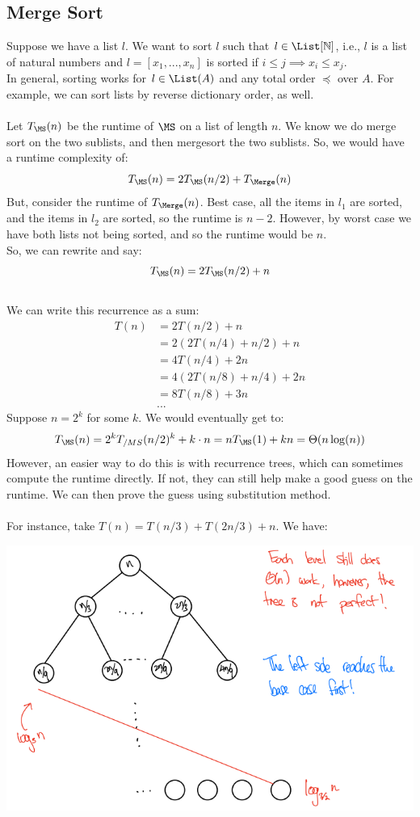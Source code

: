 \documentclass{article}
\begin{document}
\subsection{Merge Sort}
Suppose we have a list $l$. We want to sort $l$ such that $l \in \List[\mathbb{N}]$, i.e., $l$ is a list of natural numbers and $l = [x_1, ..., x_n]$ is sorted if $i \leq j \implies x_i \leq x_j$.\\
In general, sorting works for $l \in \List(A)$ and any total order $\preceq$ over $A$. For example, we can sort lists by reverse dictionary order, as well.\\
\\
Let $T_{\MS}(n)$ be the runtime of $\MS$ on a list of length $n$. We know we do merge sort on the two sublists, and then mergesort the two sublists. So, we would have a runtime complexity of:
$$T_{\MS}(n) = 2 T_{\MS}(n/2) + T_{\Merge}(n)$$
But, consider the runtime of $T_{\Merge}(n)$. Best case, all the items in $l_1$ are sorted, and the items in $l_2$ are sorted, so the runtime is $n - 2$. However, by worst case we have both lists not being sorted, and so the runtime would be $n$.\\
So, we can rewrite and say:
$$T_{\MS}(n) = 2 T_{\MS}(n/2) + n$$
\\
We can write this recurrence as a sum:
\begin{align*}
    T(n) & = 2T(n/2) + n\\
    & = 2(2T(n/4) + n/2) + n\\
    & = 4T(n/4)+2n\\
    & = 4(2T(n/8) + n/4) + 2n\\
    & = 8T(n/8) + 3n\\
    & ...
\end{align*}
Suppose $n = 2^k$ for some $k$. We would eventually get to:
$$T_{\MS}(n) = 2^k T_{/MS}(n/2)^k + k \cdot n = n T_{\MS}(1) + kn = \Theta(n \log(n))$$
However, an easier way to do this is with recurrence trees, which can sometimes compute the runtime directly. If not, they can still help make a good guess on the runtime. We can then prove the guess using substitution method.\\
\\
For instance, take $T(n) = T(n/3) + T(2n/3) + n$. We have:
\begin{center}
    \includegraphics[scale=0.5]{recursion-tree1.png}
\end{center}
\end{document}
